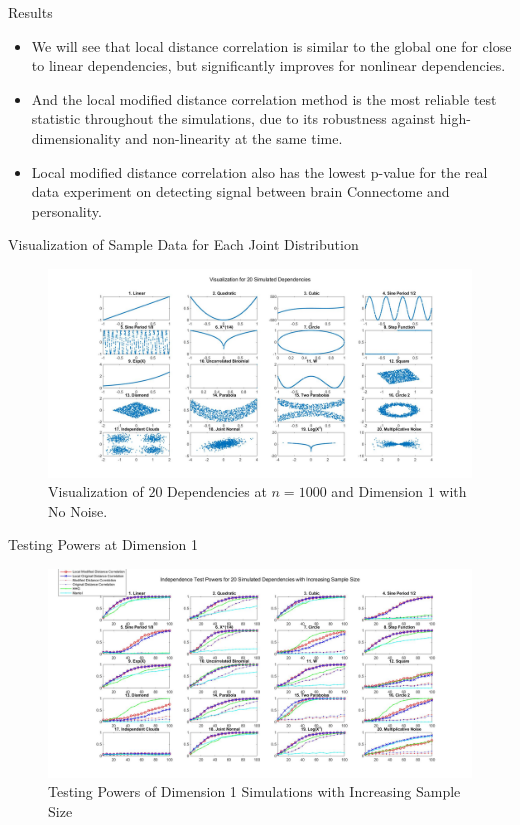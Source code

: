 \documentclass{beamer}
\begin{document}
\begin{frame}{Results}
\begin{itemize}[<+->]
\item We will see that local distance correlation is similar to the global one for close to linear dependencies, but significantly improves for nonlinear dependencies. 
\item And the local modified distance correlation method is the most reliable test statistic throughout the simulations, due to its robustness against high-dimensionality and non-linearity at the same time.
\item Local modified distance correlation also has the lowest p-value for the real data experiment on detecting signal between brain Connectome and personality.
\end{itemize}
\end{frame}

\begin{frame}{Visualization of Sample Data for Each Joint Distribution}
\begin{figure}[ht]
  \centering
  \includegraphics[width=1.0\textwidth]{Fig0.jpg}
	\caption{Visualization of $20$ Dependencies at $n=1000$ and Dimension $1$ with No Noise.}
	\label{fig1}
\end{figure} 
\end{frame}

\begin{frame}{Testing Powers at Dimension 1}
\begin{figure}[ht]
  \centering
  \includegraphics[width=1.0\textwidth]{Fig1.jpg}
	\caption{Testing Powers of Dimension 1 Simulations with Increasing Sample Size}
	\label{fig2}
\end{figure} 
\end{frame}
\end{document}
